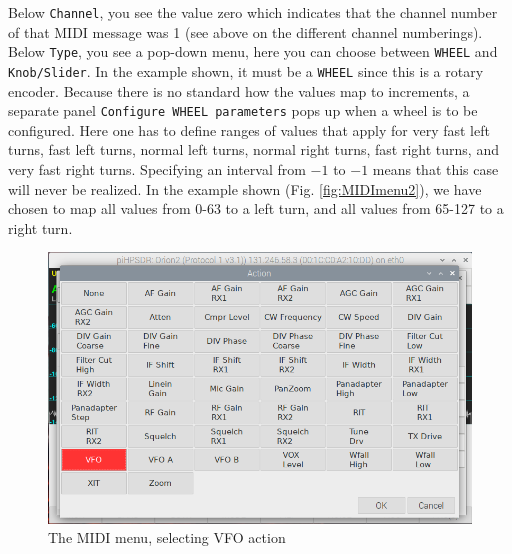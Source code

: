 \documentclass[12pt]{book}
\def\rett#1{\texttt{\color{red}#1}}
\begin{document}
Below \rett{Channel}, you see the value zero which
indicates that the channel number of that MIDI message was 1 (see above on the
different channel numberings). Below \rett{Type}, you see a pop-down menu, here
you can choose between \rett{WHEEL} and \rett{Knob/Slider}. In the example shown,
it must be a \rett{WHEEL} since this is a rotary encoder. Because there is no
standard how the values map to increments, a separate panel
\rett{Configure WHEEL parameters} pops up when a wheel is to be configured.
Here one has to define ranges of values that apply for very fast left turns,
fast left turns, normal left turns, normal right turns, fast right turns,
and very fast right turns. Specifying an interval from $-1$ to $-1$ means that
this case will never be realized. In the example shown (Fig. \ref{fig:MIDImenu2}),
we have chosen to map all values from 0-63 to a left turn, and all values from 65-127
to a right turn.
\begin{figure}[ht!]
\center
\includegraphics[width=12cm]{MIDImenu3.png}
\caption{The MIDI menu, selecting VFO action}
\label{fig:MIDImenu3}
\end{figure}
\end{document}
